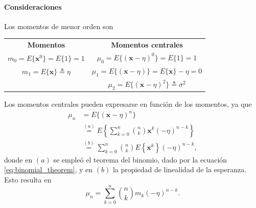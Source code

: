 \documentclass[a4paper]{report}
\newcommand{\x}{\mathbf{x}}
\begin{document}
\paragraph{Consideraciones} Los momentos de menor orden son

\bgroup
\def\arraystretch{2.5}
\begin{center}
\begin{tabular}{c|c} 
\textbf{Momentos} & \textbf{Momentos centrales}\\ 
\(m_0=E\{\x^0\}=E\{1\}=1\)    & \(\mu_0=E\{(\x-\eta)^0\}=E\{1\}=1\)\\
\(m_1=E\{\x\}\triangleq\eta\) & \(\mu_1=E\{(\x-\eta)\}=E\{\x\}-\eta=0\)\\
                              & \(\mu_2=E\{(\x-\eta)^2\}\triangleq\sigma^2\)
\end{tabular}
\end{center}
\egroup

Los momentos centrales pueden expresarse en función de los momentos, ya que
\begin{align*}
 \mu_n&=E\{(\x-\eta)^n\}\\
   &\overset{(a)}{=}E\left\{\sum_{k=0}^{n}\binom{n}{k}\x^k\left(-\eta\right)^{n-k}\right\}\\
   &\overset{(b)}{=}\sum_{k=0}^{n}\binom{n}{k}E\left\{\x^k\right\}\left(-\eta\right)^{n-k},
\end{align*}
donde en \((a)\) se empleó el teorema del binomio, dado por la ecuación \ref{eq:binomial_theorem}, y en \((b)\) la propiedad de linealidad de la esperanza. Esto resulta en
\begin{equation}\label{eq:central_moments_as_function_of_moments}
 \mu_n=\sum_{k=0}^{n}\binom{n}{k}m_k\left(-\eta\right)^{n-k}.
\end{equation}
\end{document}
